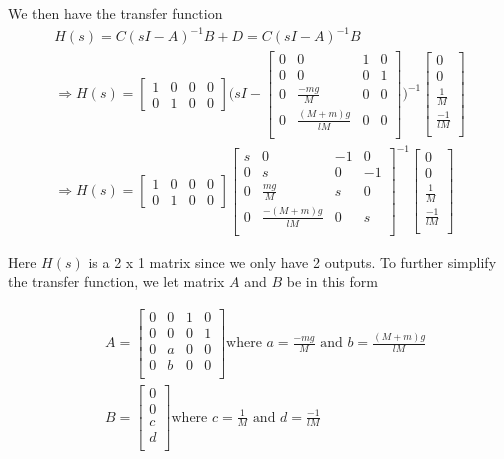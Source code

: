 \documentclass [12pt,letterpaper]{exam}
\begin{document}
We then have the transfer function
\begin{align}
H(s) = C(sI - A)^{-1}B + D = C(sI - A)^{-1}B \\
\Rightarrow H(s) = \begin{bmatrix}
1 & 0 & 0 & 0 \\
0 & 1 & 0 & 0
\end{bmatrix}
\Bigg(sI - \begin{bmatrix}
0 & 0 & 1 & 0 \\
0 & 0 & 0 & 1 \\
0 & \frac{-mg}{M} & 0 & 0 \\
0 & \frac{(M + m)g}{lM} & 0 & 0 \\
\end{bmatrix}
\Bigg)^{-1} \begin{bmatrix}
0 \\
0 \\
\frac{1}{M} \\
\frac{-1}{lM} \\
\end{bmatrix} \\
\Rightarrow H(s) = \begin{bmatrix}
1 & 0 & 0 & 0 \\
0 & 1 & 0 & 0
\end{bmatrix}
\begin{bmatrix}
s & 0 & -1 & 0 \\
0 & s & 0 & -1 \\
0 & \frac{mg}{M} & s & 0 \\
0 & \frac{-(M + m)g}{lM} & 0 & s \\
\end{bmatrix}^{-1} \begin{bmatrix}
0 \\
0 \\
\frac{1}{M} \\
\frac{-1}{lM} \\
\end{bmatrix}
\end{align}

Here $H(s)$ is a 2 x 1 matrix since we only have 2 outputs. To further simplify the transfer function, we let matrix $A$ and $B$ be in this form

\begin{align}
& A = \begin{bmatrix}
0 & 0 & 1 & 0 \\
0 & 0 & 0 & 1 \\
0 & a & 0 & 0 \\
0 & b & 0 & 0 \\
\end{bmatrix} \mbox{where } a = \frac{-mg}{M} \mbox{ and } b = \frac{(M + m)g}{lM} \\
& B = \begin{bmatrix}
0 \\
0 \\
c \\
d \\
\end{bmatrix} \mbox{where } c = \frac{1}{M} \mbox{ and } d = \frac{-1}{lM}
\end{align}
\end{document}
